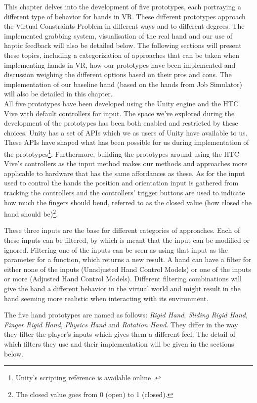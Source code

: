 This chapter delves into the development of five prototypes, each portraying a different type of behavior for hands in VR. These different prototypes approach the Virtual Constraints Problem in different ways and to different degrees. The implemented grabbing system, visualisation of the real hand and our use of haptic feedback will also be detailed below. The following sections will present these topics, including a categorization of approaches that can be taken when implementing hands in VR, how our prototypes have been implemented and discussion weighing the different options based on their pros and cons. The implementation of our baseline hand (based on the hands from Job Simulator) will also be detailed in this chapter.\\

All five prototypes have been developed using the Unity engine and the HTC Vive with default controllers for input. The space we've explored during the development of the prototypes has been both enabled and restricted by these choices. Unity has a set of APIs which we as users of Unity have available to us. These APIs have shaped what has been possible for us during implementation of the prototypes\footnote{Unity's scripting reference is available online \parencite{UnityScriptingReference2017}.}. Furthermore, building the prototypes around using the HTC Vive's controllers as the input method makes our methods and approaches more applicable to hardware that has the same affordances as these. As for the input used to control the hands the position and orientation input is gathered from tracking the controllers and the controllers' trigger buttons are used to indicate how much the fingers should bend, referred to as the closed value (how closed the hand should be)\footnote{The closed value goes from 0 (open) to 1 (closed).}.

These three inputs are the base for different categories of approaches. Each of these inputs can be filtered, by which is meant that the input can be modified or ignored. Filtering one of the inputs can be seen as using that input as the parameter for a function, which returns a new result. A hand can have a filter for either none of the inputs (Unadjusted Hand Control Models) or one of the inputs or more (Adjusted Hand Control Models). Different filtering combinations will give the hand a different behavior in the virtual world and might result in the hand seeming more realistic when interacting with its environment.

The five hand prototypes are named as follows: \textit{Rigid Hand}, \textit{Sliding Rigid Hand}, \textit{Finger Rigid Hand}, \textit{Physics Hand} and \textit{Rotation Hand}. They differ in the way they filter the player's inputs which gives them a different feel. The detail of which filters they use and their implementation will be given in the sections below.

